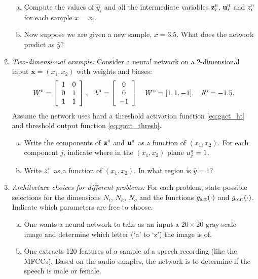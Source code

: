 \documentclass[11pt]{article}
\def\x{\times}
\newcommand{\ubf}{\mathbf{u}}
\newcommand{\xbf}{\mathbf{x}}
\newcommand{\zbf}{\mathbf{z}}
\def\hid{\textsc{\tiny H}}
\def\out{\textsc{\tiny O}}
\begin{document}
\begin{enumerate}
\begin{enumerate}[(a)]
\item Compute the values of $\hat{y}_i$ and all
the intermediate variables $\zbf_i^\hid$,
$\ubf_i^\hid$ and $z^\out_i$ for each sample $x=x_i$.

\item Now suppose we are given a new sample, $x=3.5$.  What does the network
predict as $\hat{y}$?
\end{enumerate}

\item \emph{Two-dimensional example:} Consider a neural network
on a 2-dimensional input $\xbf=(x_1,x_2)$ with weights and biases:
\[
    W^\hid = \left[ \begin{array}{cc} 1 & 0 \\ 0 & 1 \\ 1 & 1 \end{array} \right], \quad
    b^\hid = \left[ \begin{array}{c} 0 \\ 0 \\ -1 \end{array} \right] \quad
    W^\out = [1, 1, -1], \quad b^\out = -1.5.
\]
Assume the network uses hard a
threshold activation function \eqref{eq:gact_ht} and
threshold output function \eqref{eq:gout_thresh}.
\begin{enumerate}[(a)]
\item Write the components of $\zbf^\hid$ and $\ubf^\hid$ as a function
of $(x_1,x_2)$.  For each component $j$, indicate where in the $(x_1,x_2)$
plane $u^\hid_j=1$.

\item Write $z^\out$ as a function of $(x_1,x_2)$.  In what region is
$\hat{y}=1$?
\end{enumerate}

\item \emph{Architecture choices for different problems:}
For each problem, state possible selections for the dimensions
$N_i$, $N_h$, $N_o$ and the functions $g_{\rm act}(\cdot)$ and
$g_{\rm out}(\cdot)$.   Indicate which parameters are free to choose.
\begin{enumerate}[(a)]
\item One wants a neural network to take as an input a $20 \x 20$
gray scale image and determine which letter (`a' to `z')
the image is of.

\item One extracts 120 features of a sample of a
speech recording (like the MFCCs).
Based on the audio samples, the network is to determine if the speech
is male or female.


\end{enumerate}
\end{enumerate}
\end{document}
